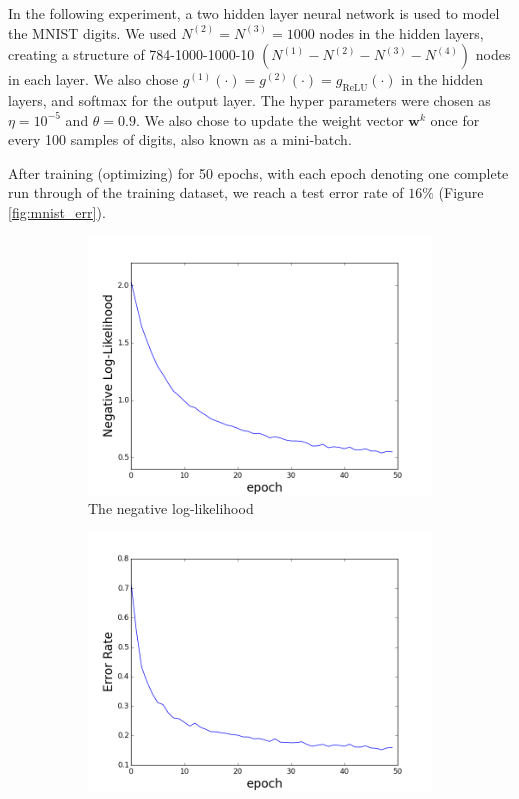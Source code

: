 In the following experiment, 
a two hidden layer neural network is used to model the MNIST digits.
We used $N^{(2)} = N^{(3)} = 1000$ nodes in the hidden layers, 
creating a structure of 784-1000-1000-10 
$\left( N^{(1)} - N^{(2)} - N^{(3)} - N^{(4)} \right)$
nodes in each layer.
We also chose 
$g^{(1)}(\cdot) = g^{(2)}(\cdot) = g_\text{ReLU}(\cdot)$ 
in the hidden layers,
and softmax for the output layer.
The hyper parameters were chosen as $\eta = 10^{-5}$
and $\theta = 0.9$.
We also chose to update the weight vector $\mathbf{w}^k$ once
for every 100 samples of digits,
also known as a mini-batch.

After training (optimizing) for 50 epochs,
with each epoch denoting one complete run through of the training 
dataset,
we reach a test error rate of $16\%$ (Figure \ref{fig:mnist_err}).
%
\begin{figure}[h]
\centering
\begin{subfigure}{.45\textwidth}
  \centering
  \includegraphics[width=\linewidth]{fig_mnist_nll.png}
  \caption{The negative log-likelihood}
  \label{fig:mnist_nll}
\end{subfigure}%
\begin{subfigure}{.45\textwidth}
  \centering
  \includegraphics[width=\linewidth]{fig_mnist_err.png}

\end{subfigure}
\end{figure}
